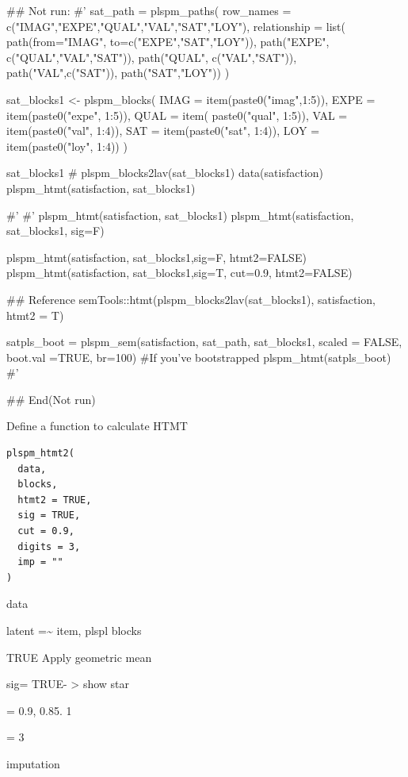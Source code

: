 \documentclass[a4paper]{book}
\begin{document}
\begin{Examples}
\begin{ExampleCode}
## Not run: 
#'
sat_path = plspm_paths(
row_names = c("IMAG","EXPE","QUAL","VAL","SAT","LOY"),
relationship = list(
  path(from="IMAG", to=c("EXPE","SAT","LOY")),
  path("EXPE", c("QUAL","VAL","SAT")),
  path("QUAL", c("VAL","SAT")),
  path("VAL",c("SAT")),
  path("SAT","LOY"))
)

sat_blocks1 <- plspm_blocks(
  IMAG = item(paste0("imag",1:5)),
  EXPE = item(paste0("expe", 1:5)),
  QUAL = item( paste0("qual", 1:5)),
  VAL = item(paste0("val", 1:4)),
  SAT = item(paste0("sat", 1:4)),
  LOY = item(paste0("loy", 1:4))
)

sat_blocks1
# plspm_blocks2lav(sat_blocks1) %
data(satisfaction)
plspm_htmt(satisfaction, sat_blocks1)

#'
#'
plspm_htmt(satisfaction, sat_blocks1)
plspm_htmt(satisfaction, sat_blocks1, sig=F)

plspm_htmt(satisfaction, sat_blocks1,sig=F, htmt2=FALSE)
plspm_htmt(satisfaction, sat_blocks1,sig=T, cut=0.9, htmt2=FALSE)

## Reference
semTools::htmt(plspm_blocks2lav(sat_blocks1),
               satisfaction,
               htmt2 = T)

 satpls_boot = plspm_sem(satisfaction, sat_path, sat_blocks1,
  scaled = FALSE, boot.val =TRUE, br=100)
 #If you've bootstrapped
 plspm_htmt(satpls_boot)
#'


## End(Not run)



\end{ExampleCode}
\end{Examples}
%
\begin{Description}
Define a function to calculate HTMT
\end{Description}
%
\begin{Usage}
\begin{verbatim}
plspm_htmt2(
  data,
  blocks,
  htmt2 = TRUE,
  sig = TRUE,
  cut = 0.9,
  digits = 3,
  imp = ""
)
\end{verbatim}
\end{Usage}
%
\begin{Arguments}
\begin{ldescription}
\item[\code{data}] data

\item[\code{blocks}] latent =\textasciitilde{} item, plspl blocks

\item[\code{htmt2}] TRUE Apply geometric mean

\item[\code{sig}] sig= TRUE- > show star

\item[\code{cut}] = 0.9, 0.85. 1

\item[\code{digits}] = 3

\item[\code{imp}] imputation
\end{ldescription}
\end{Arguments}
\end{document}
